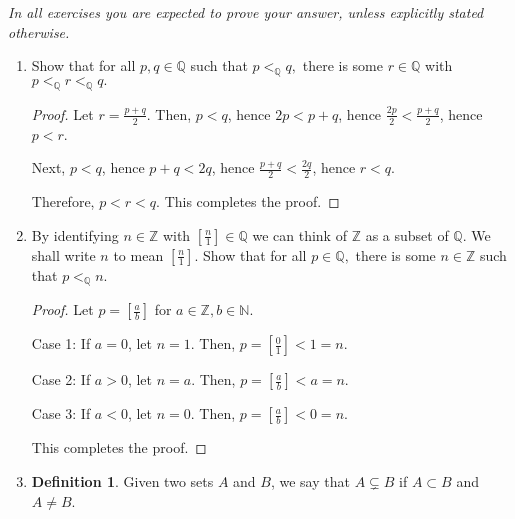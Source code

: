 \documentclass[11pt]{article}
\newcommand{\bbN}{\mathbb{N}}
\newcommand{\bbQ}{\mathbb{Q}}
\newcommand{\bbZ}{\mathbb{Z}}
\renewcommand{\_}[1]{\underline{ #1 }}
\theoremstyle{definition}
\newtheorem{definition}[theorem]{Definition}
\numberwithin{equation}{subsection}
\begin{document}
{\em In all exercises you are expected to prove your answer, unless explicitly stated otherwise.}

\begin{enumerate}

\item Show that for all $p,q\in \bbQ$ such that $p<_{\bbQ}q,$ there is some $r\in \bbQ$ with $p<_{\bbQ} r <_{\bbQ}q.$

\begin{proof}
Let $r = \frac{p+q}{2}$. Then, $p<q$, hence $2p<p+q$, hence $\frac{2p}{2} < \frac{p+q}{2}$, hence $p < r$.

Next, $p<q$, hence $p+q<2q$, hence $\frac{p+q}{2} < \frac{2q}{2}$, hence $r < q$.

Therefore, $p<r<q$. This completes the proof.

\renewcommand\qedsymbol{QED}
\end{proof}


\item By identifying $n\in \bbZ$ with $[\frac{n}{1}]\in \bbQ$ we can think of $\bbZ$ as a subset of $\bbQ.$ 
We shall write $n$ to mean $[\frac{n}{1}].$ Show that for all $p\in \bbQ,$ there is some 
$n\in \bbZ$ such that $p<_{\bbQ} n.$

\begin{proof}
Let $p = [\frac{a}{b}]$ for $a \in \bbZ, b \in \bbN$. 

Case 1: If $a=0$, let $n = 1$. Then, $p = [\frac{0}{1}]<1 = n$.

Case 2: If $a>0$, let $n = a$. Then, $p = [\frac{a}{b}]<a = n$.

Case 3: If $a<0$, let $n = 0$. Then, $p= [\frac{a}{b}]<0 = n$.

This completes the proof.

\renewcommand\qedsymbol{QED}
\end{proof}



\item


\begin{definition}
	Given two sets $A$ and $B$, we say that $A\subsetneq B$ if $A\subset B$ and $A\neq B$.
\end{definition}


\end{enumerate}
\end{document}
